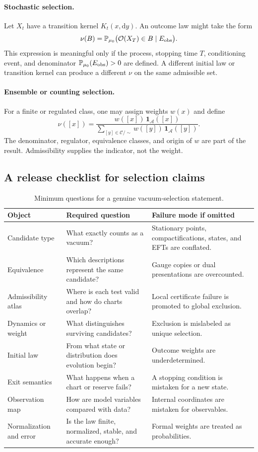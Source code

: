 \documentclass[11pt]{article}
\theoremstyle{definition}
\theoremstyle{remark}
\newcommand{\cA}{\mathcal A}
\newcommand{\cC}{\mathcal C}
\newcommand{\cO}{\mathcal O}
\newcommand{\PP}{\mathbb P}
\newcommand{\1}{\mathbf 1}
\newcommand{\dd}{\mathrm d}
\begin{document}
\paragraph{Stochastic selection.}
Let \(X_t\) have a transition kernel \(K_t(x,\dd y)\).  An outcome law might
take the form
\[
  \nu(B)
  =
  \PP_{\mu_0}
  \bigl(\cO(X_T)\in B\mid E_{\rm obs}\bigr).
\]
This expression is meaningful only if the process, stopping time \(T\),
conditioning event, and denominator
\(\PP_{\mu_0}(E_{\rm obs})>0\) are defined.  A different initial law or
transition kernel can produce a different \(\nu\) on the same admissible
set.

\paragraph{Ensemble or counting selection.}
For a finite or regulated class, one may assign weights \(w(x)\) and define
\[
  \nu([x])
  =
  \frac{w([x])\,\1_{\cA}([x])}
       {\sum_{[y]\in\cC/\sim}w([y])\,\1_{\cA}([y])}.
\]
The denominator, regulator, equivalence classes, and origin of \(w\) are
part of the result.  Admissibility supplies the indicator, not the weight.

\subsection{A release checklist for selection claims}

\begin{table}[htbp]
\centering
\small
\begin{tabularx}{\textwidth}{L{0.24\textwidth}YY}
\toprule
Object & Required question & Failure mode if omitted \\
\midrule
Candidate type
& What exactly counts as a vacuum?
& Stationary points, compactifications, states, and EFTs are conflated. \\
Equivalence
& Which descriptions represent the same candidate?
& Gauge copies or dual presentations are overcounted. \\
Admissibility atlas
& Where is each test valid and how do charts overlap?
& Local certificate failure is promoted to global exclusion. \\
Dynamics or weight
& What distinguishes surviving candidates?
& Exclusion is mislabeled as unique selection. \\
Initial law
& From what state or distribution does evolution begin?
& Outcome weights are underdetermined. \\
Exit semantics
& What happens when a chart or reserve fails?
& A stopping condition is mistaken for a new state. \\
Observation map
& How are model variables compared with data?
& Internal coordinates are mistaken for observables. \\
Normalization and error
& Is the law finite, normalized, stable, and accurate enough?
& Formal weights are treated as probabilities. \\
\bottomrule
\end{tabularx}
\caption{Minimum questions for a genuine vacuum-selection statement.}
\label{tab:release}
\end{table}
\end{document}
